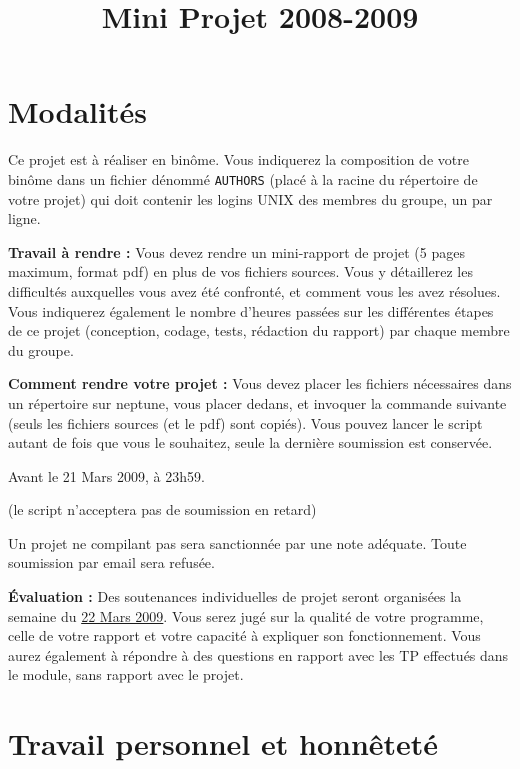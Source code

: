 \documentclass[10pt]{article}
\begin{document}
\color{black}
\title{Mini Projet 2008-2009}
\maketitle


\section*{Modalités}

Ce projet est à réaliser en binôme. Vous indiquerez la composition de
votre binôme dans un fichier dénommé \texttt{AUTHORS} (placé  à la
racine du répertoire de votre projet) qui doit contenir les logins
UNIX des membres du groupe, un par ligne.


{\bf Travail à rendre :} Vous devez rendre un mini-rapport de projet (5 pages
maximum, format pdf) en plus de vos fichiers sources.  Vous y détaillerez les
difficultés auxquelles vous avez été confronté, et comment vous les avez
résolues. Vous indiquerez également le nombre d'heures passées sur les
différentes étapes de ce projet (conception, codage, tests, rédaction du
rapport) par chaque membre du groupe.

{\bf Comment rendre votre projet :} Vous devez placer les fichiers nécessaires
dans un répertoire sur neptune, vous placer dedans, et invoquer la commande
suivante (seuls les fichiers sources (et le pdf) sont copiés). Vous pouvez
lancer le script autant de fois que vous le souhaitez, seule la dernière
soumission est conservée.
\begin{center}

{\Large Avant le 21 Mars 2009, à 23h59.} 

(le script n'acceptera pas de soumission en retard)
\end{center}

Un projet ne compilant pas sera sanctionnée par une note adéquate. Toute
soumission par email sera refusée.

{\bf Évaluation :} Des soutenances individuelles de projet seront organisées la
semaine du \underline{22 Mars 2009}. Vous serez jugé sur la qualité de votre
programme, celle de votre rapport et votre capacité à expliquer son
fonctionnement. Vous aurez également à répondre à des questions en rapport avec
les TP effectués dans le module, sans rapport  avec le projet.

\section*{Travail personnel et honnêteté}
\end{document}

